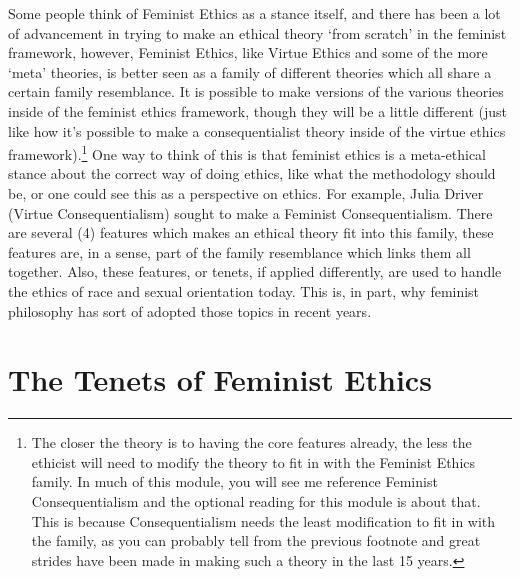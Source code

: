 Some people think of Feminist Ethics as a stance itself, and there has been a lot of advancement in trying to make an ethical theory `from scratch' in the feminist framework, however, Feminist Ethics, like Virtue Ethics and some of the more `meta' theories, is better seen as a family of different theories which all share a certain family resemblance. It is possible to make versions of the various theories inside of the feminist ethics framework, though they will be a little different (just like how it’s possible to make a consequentialist theory inside of the virtue ethics framework).\footnote{The closer the theory is to having the core features already, the less the ethicist will need to modify the theory to fit in with the Feminist Ethics family. In much of this module, you will see me reference Feminist Consequentialism and the optional reading for this module is about that. This is because Consequentialism needs the least modification to fit in with the family, as you can probably tell from the previous footnote and great strides have been made in making such a theory in the last 15 years.} One way to think of this is that feminist ethics is a meta-ethical stance about the correct way of doing ethics, like what the methodology should be, or one could see this as a perspective on ethics. For example, Julia Driver (Virtue Consequentialism) sought to make a Feminist Consequentialism. There are several (4) features which makes an ethical theory fit into this family, these features are, in a sense, part of the family resemblance which links them all together. Also, these features, or tenets, if applied differently, are used to handle the ethics of race and sexual orientation today. This is, in part, why feminist philosophy has sort of adopted those topics in recent years. 

\section{The Tenets of Feminist Ethics}

